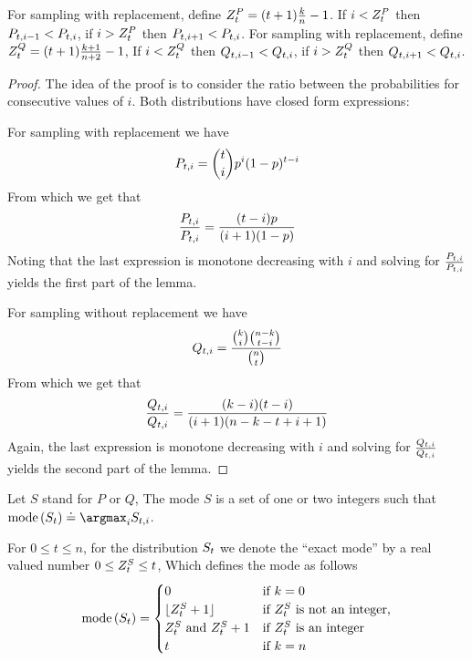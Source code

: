 \begin{lemma}
  For sampling with replacement, define $Z^{P}_t = (t+1)\frac{k}{n}-1$. If
  $i<Z^{P}_t$ then $P_{t,i-1}<P_{t,i}$, if $i>Z^{P}_t$
  then $P_{t,i+1}<P_{t,i}$.\newline
  For sampling with replacement, define $Z^{Q}_t =(t+1)\frac{k+1}{n+2}-1$,
  If $i<Z^{Q}_t$ then $Q_{t,i-1}<Q_{t,i}$, if $i>Z^{Q}_t$
  then $Q_{t,i+1}<Q_{t,i}$.\newline
\end{lemma}
\begin{proof}
  The idea of the proof is to consider the ratio between the
  probabilities for consecutive values of $i$. Both distributions have
  closed form expressions:

  For sampling with replacement we have 
  \[
  P_{t,i}={t \choose i} p^i (1-p)^{t-i}
  \]
  From which we get that
  \[
  \frac{P_{t,i}}{P_{t,i}} = \frac{(t-i)p}{(i+1)(1-p)}
  \]
  Noting that the last expression is monotone decreasing with $i$ and
  solving for $\frac{P_{t,i}}{P_{t,i}}$ yields the first
  part of the lemma.\newline

  For sampling without replacement we have 
  \[
  Q_{t,i}=\frac{{k \choose i}{n-k \choose t-i}}{{n \choose t}}
  \]
  From which we get that
  \[
  \frac{Q_{t,i}}{Q_{t,i}} = \frac{(k-i)(t-i)}{(i+1)(n-k-t+i+1)}
  \]
  Again, the last expression is monotone decreasing with $i$ and
  solving for $\frac{Q_{t,i}}{Q_{t,i}}$ yields the second
  part of the lemma.
  \end{proof}


\iffalse
Let $S$ stand for $P$ or $Q$, The mode $S$ is a set of one or two
integers such that  $\mode{\prob{S}{t}} \doteq \argmax_{i} \prob{S}{t,i}$.
  
  For $0 \leq t \leq n$, for the distribution $S_{t}$ we denote the
  ``exact mode'' by a real valued number $0\leq Z^{S}_t \leq t$,
  Which defines the mode as follows
  \begin{equation}\label{eqn:mode}
    \mbox{mode}\left(S_{t}\right) = \begin{cases}
      0 & \mbox{if $k=0$} \\
    \lfloor Z^{S}_t+1 \rfloor & \mbox{if $Z^{S}_t$ is not
      an integer,} \\
      Z^{S}_t \mbox{ and } Z^{S}_t+1 & \mbox{if $Z^{S}_t$ is an
        integer} \\
    t & \mbox{if $k=n$}
  \end{cases}
  \end{equation}
  
